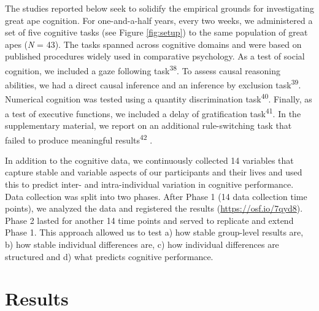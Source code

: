 \documentclass[
  man,floatsintext]{apa6}
\begin{document}
The studies reported below seek to solidify the empirical grounds for investigating great ape cognition. For one-and-a-half years, every two weeks, we administered a set of five cognitive tasks (see Figure \ref{fig:setup}) to the same population of great apes (\emph{N} = 43). The tasks spanned across cognitive domains and were based on published procedures widely used in comparative psychology. As a test of social cognition, we included a gaze following task\textsuperscript{38}. To assess causal reasoning abilities, we had a direct causal inference and an inference by exclusion task\textsuperscript{39}. Numerical cognition was tested using a quantity discrimination task\textsuperscript{40}. Finally, as a test of executive functions, we included a delay of gratification task\textsuperscript{41}. In the supplementary material, we report on an additional rule-switching task that failed to produce meaningful results\textsuperscript{42} .

In addition to the cognitive data, we continuously collected 14 variables that capture stable and variable aspects of our participants and their lives and used this to predict inter- and intra-individual variation in cognitive performance. Data collection was split into two phases. After Phase 1 (14 data collection time points), we analyzed the data and registered the results (\url{https://osf.io/7qyd8}). Phase 2 lasted for another 14 time points and served to replicate and extend Phase 1. This approach allowed us to test a) how stable group-level results are, b) how stable individual differences are, c) how individual differences are structured and d) what predicts cognitive performance.

\hypertarget{results}{%
\section{Results}\label{results}}
\end{document}
